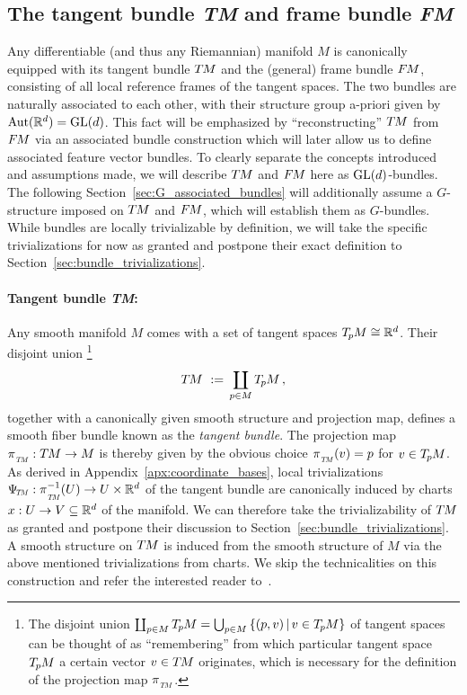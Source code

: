 

\subsection{The tangent bundle \textit{TM} and frame bundle \textit{FM}}
\label{sec:GL_associated_bundles}


Any differentiable (and thus any Riemannian) manifold $M$ is canonically equipped with its tangent bundle $T\mkern-1.5muM$ and the (general) frame bundle $F\mkern-1.5muM$, consisting of all local reference frames of the tangent spaces.
The two bundles are naturally associated to each other, with their structure group a-priori given by $\operatorname{Aut}(\mathbb{R}^d) = \operatorname{GL}(d)$.
This fact will be emphasized by ``reconstructing'' $T\mkern-1.5muM$ from $F\mkern-1.5muM$ via an associated bundle construction which will later allow us to define associated feature vector bundles.
To clearly separate the concepts introduced and assumptions made, we will describe $T\mkern-1.5muM$ and $F\mkern-1.5muM$ here as $\operatorname{GL}(d)$-bundles.
The following Section~\ref{sec:G_associated_bundles} will additionally assume a $G$-structure imposed on $T\mkern-1.5muM$ and $F\mkern-1.5muM$, which will establish them as $G$-bundles.
While bundles are locally trivializable by definition, we will take the specific trivializations for now as granted and postpone their exact definition to Section~\ref{sec:bundle_trivializations}.




\paragraph{Tangent bundle \textit{TM}:}

Any smooth manifold $M$ comes with a set of tangent spaces $T_{\mkern-1.5mu p}\mkern-.5muM\cong\mathbb{R}^d$.
Their disjoint union%
\footnote{%
    The disjoint union $\coprod_{p\in M} T_{\mkern-1.5mu p}\mkern-.5muM = \bigcup_{p\in M} \left\{(p,v) \,|\, v\in T_{\mkern-1.5mu p}\mkern-.5muM\right\}$ of tangent spaces can be thought of as ``remembering'' from which particular tangent space $T_{\mkern-1.5mu p}\mkern-.5muM$ a certain vector $v\in T\mkern-1.5muM$ originates, which is necessary for the definition of the projection map $\piTM$.
}
\begin{align}
    T\mkern-1.5muM\ :=\, \coprod_{p\in M} T_{\mkern-1.5mu p}\mkern-.5muM \,,
\end{align}
together with a canonically given smooth structure and projection map, defines a smooth fiber bundle known as the \emph{tangent bundle}.
The projection map ${\piTM: \TM\to M}$ is thereby given by the obvious choice ${\piTM(v)=p}$ for $v\in T_{\mkern-1.5mu p}\mkern-.5muM$.
As derived in Appendix~\ref{apx:coordinate_bases}, local trivializations $\PsiTM: \piTM^{-1}(U) \to U\times \R^d$ of the tangent bundle are canonically induced by charts $x:U\to V\subseteq \mathbb{R}^d$ of the manifold.
We can therefore take the trivializability of $T\mkern-1.5muM$ as granted and postpone their discussion to Section~\ref{sec:bundle_trivializations}.
A smooth structure on $T\mkern-1.5muM$ is induced from the smooth structure of $M$ via the above mentioned trivializations from charts.
We skip the technicalities on this construction and refer the interested reader to~\cite{schullerGeometricalAnatomy2016,nakahara2003geometry}.

